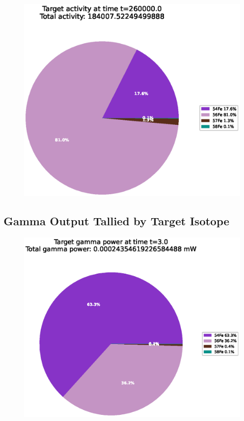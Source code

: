 \begin{figure}[!htb]
\centering
\includegraphics[width=0.8\linewidth]{chapters/results_activity_code/fe-activity-v2/target-activity/0300_260000.eps}
\caption{}
\label{fig:activity-v2-target-activity-260000s}
\end{figure}




\clearpage

\subsection{Gamma Output Tallied by Target Isotope}

\FloatBarrier


\begin{figure}[!htb]
\centering
\includegraphics[width=0.8\linewidth]{chapters/results_activity_code/fe-activity-v2/target-energy/0001_3.eps}
\caption{}
\label{fig:activity-v2-target-power-3s}
\end{figure}

